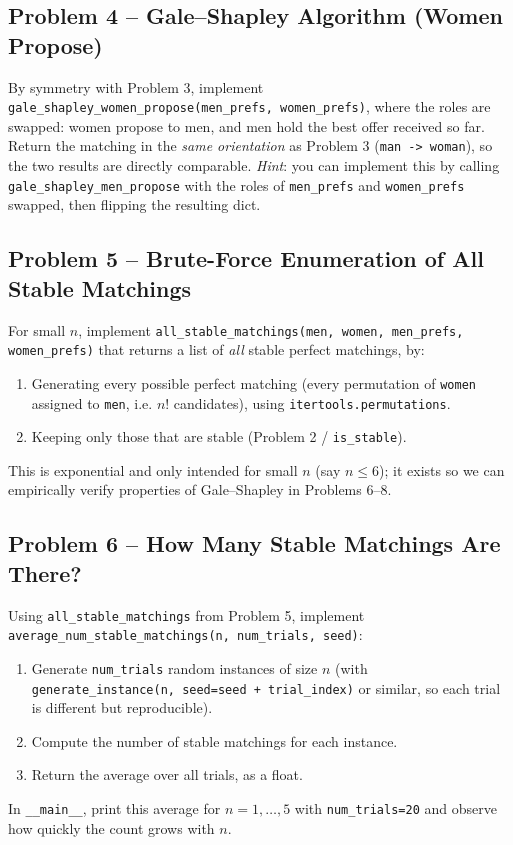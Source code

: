 \documentclass[11pt]{article}
\begin{document}
\subsection*{Problem 4 -- Gale--Shapley Algorithm (Women Propose)}

By symmetry with Problem 3, implement \texttt{gale\_shapley\_women\_propose(men\_prefs,
women\_prefs)}, where the roles are swapped: women propose to men, and men hold the best
offer received so far. Return the matching in the \emph{same orientation} as Problem 3
(\texttt{man -> woman}), so the two results are directly comparable. \emph{Hint}: you can
implement this by calling \texttt{gale\_shapley\_men\_propose} with the roles of
\texttt{men\_prefs} and \texttt{women\_prefs} swapped, then flipping the resulting dict.

\subsection*{Problem 5 -- Brute-Force Enumeration of All Stable Matchings}

For small $n$, implement \texttt{all\_stable\_matchings(men, women, men\_prefs,
women\_prefs)} that returns a list of \emph{all} stable perfect matchings, by:
\begin{enumerate}
    \item Generating every possible perfect matching (every permutation of \texttt{women}
    assigned to \texttt{men}, i.e. $n!$ candidates), using
    \texttt{itertools.permutations}.
    \item Keeping only those that are stable (Problem 2 / \texttt{is\_stable}).
\end{enumerate}
This is exponential and only intended for small $n$ (say $n \le 6$); it exists so we can
empirically verify properties of Gale--Shapley in Problems 6--8.

\subsection*{Problem 6 -- How Many Stable Matchings Are There?}

Using \texttt{all\_stable\_matchings} from Problem 5, implement
\texttt{average\_num\_stable\_matchings(n, num\_trials, seed)}:
\begin{enumerate}
    \item Generate \texttt{num\_trials} random instances of size $n$ (with
    \texttt{generate\_instance(n, seed=seed + trial\_index)} or similar, so each trial is
    different but reproducible).
    \item Compute the number of stable matchings for each instance.
    \item Return the average over all trials, as a float.
\end{enumerate}
In \texttt{\_\_main\_\_}, print this average for $n = 1, \dots, 5$ with
\texttt{num\_trials=20} and observe how quickly the count grows with $n$.
\end{document}
